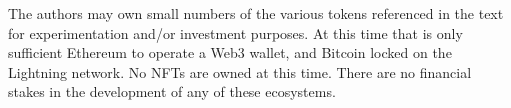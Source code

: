 The authors may own small numbers of the various tokens referenced in the text for experimentation and/or investment purposes. At this time that is only sufficient Ethereum to operate a Web3 wallet, and Bitcoin locked on the Lightning network. No NFTs are owned at this time. There are no financial stakes in the development of any of these ecosystems.